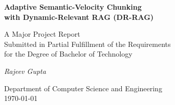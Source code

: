 \documentclass[12pt,a4paper]{article}
\begin{document}
\begin{titlepage}
\centering
\vspace*{2cm}
{\LARGE\bfseries Adaptive Semantic-Velocity Chunking\\[6pt]
with Dynamic-Relevant RAG (DR-RAG)\par}
\vspace{1.5cm}
{\large A Major Project Report\\[4pt]
Submitted in Partial Fulfillment of the Requirements\\[4pt]
for the Degree of Bachelor of Technology\par}
\vspace{2cm}
{\Large\itshape Rajeev Gupta\par}
\vfill
{\large Department of Computer Science and Engineering\\[6pt]
\today\par}
\end{titlepage}

\tableofcontents
\newpage
\end{document}

